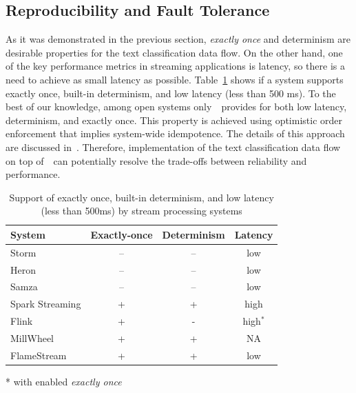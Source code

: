 \label {fs-solution}

\subsection{Reproducibility and Fault Tolerance}

As it was demonstrated in the previous section, {\em exactly once} and determinism are desirable properties for the text classification data flow. On the other hand, one of the key performance metrics in streaming applications is latency, so there is a need to achieve as small latency as possible. Table~\ref{comparison} shows if a system supports exactly once, built-in determinism, and low latency (less than 500 ms). To the best of our knowledge, among open systems only~\FlameStream\ provides for both low latency, determinism, and exactly once. This property is achieved using optimistic order enforcement that implies system-wide idempotence. The details of this approach are discussed in~\cite{we2018adbis, we2018beyondmr}. Therefore, implementation of the text classification data flow on top of~\FlameStream\ can potentially resolve the trade-offs between reliability and performance.

\begin{table}[htbp]
\caption{Support of exactly once, built-in determinism, and low latency (less than 500ms) by stream processing systems}
\begin{threeparttable}
\begin{tabular}{lccc}
System & Exactly-once & Determinism & Latency    \\
\hline
Storm  &    --      &   --       &   low            \\
Heron  &    --      &   --       &   low            \\
Samza  &    --      &   --       &   low            \\
Spark Streaming    &    +       &   +        &   high           \\
Flink              &    +       &   -        &   high$^*$       \\
MillWheel          &    +       &   +        &   NA             \\
FlameStream        &    +       &   +        &   low            \\
\end{tabular}
* with enabled {\em exactly once}~\cite{we2018beyondmr}
\end{threeparttable}
\label{comparison}
\end{table}

